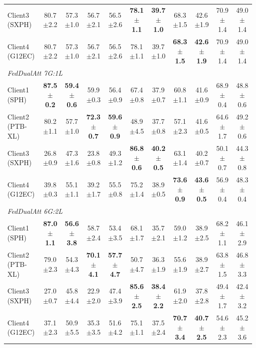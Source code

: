 \documentclass[a4paper]{article}
\begin{document}
\begin{longtable}{l|cc|cc|cc|cc|cc}
  Client3 (SXPH)   & 80.7$\pm$2.2 & 57.3$\pm$1.0 & 56.7$\pm$2.1 & 56.5$\pm$2.6 & \textbf{78.1$\pm$1.1} & \textbf{39.7$\pm$1.0} & 68.3$\pm$1.5 & 42.6$\pm$1.9 & 70.9$\pm$1.4 & 49.0$\pm$1.4 \\
  Client4 (G12EC)  & 80.7$\pm$2.2 & 57.3$\pm$1.0 & 56.7$\pm$2.1 & 56.5$\pm$2.6 & 78.1$\pm$1.1 & 39.7$\pm$1.0 & \textbf{68.3$\pm$1.5} & \textbf{42.6$\pm$1.9} & 70.9$\pm$1.4 & 49.0$\pm$1.4 \\
  \midrule
  \multicolumn{11}{l}{\textit{FedDualAtt 7G:1L}} \\
  \midrule
  Client1 (SPH)    & \textbf{87.5$\pm$0.2} & \textbf{59.4$\pm$0.6} & 59.9$\pm$0.3 & 56.4$\pm$0.9 & 67.4$\pm$0.8 & 37.9$\pm$0.7 & 60.8$\pm$1.1 & 41.6$\pm$0.9 & 68.9$\pm$0.4 & 48.8$\pm$0.6 \\
  Client2 (PTB-XL) & 80.2$\pm$1.1 & 57.7$\pm$1.0 & \textbf{72.3$\pm$0.7} & \textbf{59.6$\pm$0.9} & 48.9$\pm$4.5 & 37.7$\pm$0.8 & 57.1$\pm$2.3 & 41.6$\pm$0.5 & 64.6$\pm$1.7 & 49.2$\pm$0.6 \\
  Client3 (SXPH)   & 26.8$\pm$0.9 & 47.3$\pm$1.6 & 23.8$\pm$0.8 & 49.3$\pm$1.2 & \textbf{86.8$\pm$0.6} & \textbf{40.2$\pm$0.5} & 63.1$\pm$1.4 & 40.2$\pm$0.7 & 50.1$\pm$0.7 & 44.3$\pm$0.8 \\
  Client4 (G12EC)  & 39.8$\pm$0.3 & 55.1$\pm$1.1 & 39.2$\pm$1.7 & 55.5$\pm$0.8 & 75.2$\pm$1.4 & 38.9$\pm$0.5 & \textbf{73.6$\pm$0.9} & \textbf{43.6$\pm$0.5} & 56.9$\pm$0.4 & 48.3$\pm$0.4 \\
  \midrule
  \multicolumn{11}{l}{\textit{FedDualAtt 6G:2L}} \\
  \midrule
  Client1 (SPH)    & \textbf{87.0$\pm$1.1} & \textbf{56.6$\pm$3.8} & 58.7$\pm$2.4 & 53.4$\pm$3.5 & 68.1$\pm$1.7 & 35.7$\pm$2.1 & 59.0$\pm$1.2 & 38.9$\pm$2.5 & 68.2$\pm$1.1 & 46.1$\pm$2.9 \\
  Client2 (PTB-XL) & 79.0$\pm$2.3 & 54.3$\pm$4.3 & \textbf{70.1$\pm$4.1} & \textbf{57.7$\pm$4.7} & 50.7$\pm$4.7 & 36.3$\pm$1.9 & 55.6$\pm$1.9 & 38.9$\pm$2.7 & 63.8$\pm$1.5 & 46.8$\pm$3.3 \\
  Client3 (SXPH)   & 27.0$\pm$0.7 & 45.8$\pm$4.4 & 22.9$\pm$2.0 & 47.4$\pm$3.9 & \textbf{85.6$\pm$2.5} & \textbf{38.4$\pm$2.2} & 61.9$\pm$2.0 & 37.8$\pm$2.8 & 49.4$\pm$1.7 & 42.4$\pm$3.2 \\
  Client4 (G12EC)  & 37.1$\pm$2.3 & 50.9$\pm$5.5 & 35.3$\pm$3.5 & 51.6$\pm$4.2 & 75.1$\pm$1.1 & 37.5$\pm$2.4 & \textbf{70.7$\pm$3.4} & \textbf{40.7$\pm$2.5} & 54.6$\pm$2.3 & 45.2$\pm$3.6 \\
  \midrule

\end{longtable}
\end{document}
